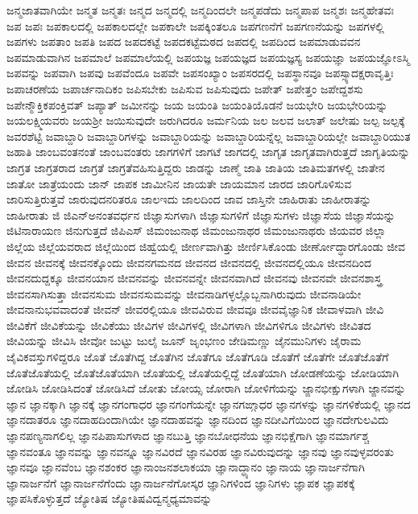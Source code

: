 {ಜನ್ಮಜಾತವಾಗಿಯೇ
ಜನ್ಮತ
ಜನ್ಮತಃ
ಜನ್ಮದ
ಜನ್ಮದಲ್ಲಿ
ಜನ್ಮದಿಂದಲೇ
ಜನ್ಮಪಡೆದು
ಜನ್ಮಪಾಪ
ಜನ್ಮಶಃ
ಜನ್ಮಹೇತವಃ
ಜಪ
ಜಪಃ
ಜಪಕಾಲದಲ್ಲಿ
ಜಪಕಾಲದಲ್ಲೇ
ಜಪಕಾಲೇ
ಜಪಕ್ಕಿಂತಲೂ
ಜಪಗಣನೆಗೆ
ಜಪಗಣನೆಯನ್ನು
ಜಪಗಳಲ್ಲಿ
ಜಪಗಳು
ಜಪತಾಂ
ಜಪತಿ
ಜಪದ
ಜಪದಕಟ್ಟೆ
ಜಪದಕಟ್ಟೆಮಠದ
ಜಪದಲ್ಲಿ
ಜಪದಿಂದ
ಜಪಮಾಡುವವನ
ಜಪಮಾಡುವಾಗಿನ
ಜಪಮಾಲೆ
ಜಪಮಾಲೆಯಲ್ಲಿ
ಜಪಯಜ್ಞ
ಜಪಯಜ್ಞದ
ಜಪಯಜ್ಞಸ್ಯ
ಜಪಯಜ್ಞಾ
ಜಪಯಜ್ಞೋಽಸ್ಮಿ
ಜಪವನ್ನು
ಜಪವಾಗಿ
ಜಪವು
ಜಪವೆಂದೂ
ಜಪವೇ
ಜಪಸಂಖ್ಯಾಂ
ಜಪಸರದಲ್ಲಿ
ಜಪಸ್ಥಾನವೂ
ಜಪಸ್ಸ್ಯಾದಕ್ಷರಾವೃತ್ತಿಃ
ಜಪಾಚರಣೆಯ
ಜಪಾರ್ಚನಾದಿಕಂ
ಜಪಿಸಬೇಕು
ಜಪಿಸುವ
ಜಪಿಸುವುದು
ಜಪೇತ್
ಜಪೇತ್ತಂ
ಜಪೇದ್ದಶಸು
ಜಪೇನ್ಮೌಕ್ತಿಕಪಂಕ್ತಿವತ್
ಜಪ್ಯಾತ್
ಜಮೀನನ್ನು
ಜಯ
ಜಯಂತಿ
ಜಯಂತಿಯೊಡನೆ
ಜಯಭೇರಿ
ಜಯಭೇರಿಯನ್ನು
ಜಯಲಕ್ಷ್ಮಿಯವರು
ಜಯಶ್ರೀ
ಜಯಿಸುವುದೇ
ಜರುಗಿದರೂ
ಜರ್ಮನಿಯ
ಜಲ
ಜಲವ
ಜಲಾತ್
ಜಲೇಷು
ಜಲ್ಪ
ಜಲ್ಪಕ್ಕೆ
ಜವರಶೆಟ್ಟಿ
ಜವಾಬ್ದಾರಿ
ಜವಾಬ್ದಾರಿಗಳನ್ನು
ಜವಾಬ್ದಾರಿಯನ್ನು
ಜವಾಬ್ದಾರಿಯನ್ನೆಲ್ಲ
ಜವಾಬ್ದಾರಿಯಲ್ಲೇ
ಜವಾಬ್ದಾರಿಯುತ
ಜಹಾತಿ
ಜಾಂಬವಂತನಂತೆ
ಜಾಂಬವಂತರು
ಜಾಗಗಳಿಗೆ
ಜಾಗಟೆ
ಜಾಗದಲ್ಲಿ
ಜಾಗೃತ
ಜಾಗೃತವಾಗಿರುತ್ತದೆ
ಜಾಗೃತಿಯನ್ನು
ಜಾಗ್ರತ
ಜಾಗ್ರತರಾದ
ಜಾಗ್ರತೆ
ಜಾಗ್ರತೆವಹಿಸುತ್ತಿದ್ದರು
ಜಾಡನ್ನು
ಜಾಣ್ಮೆ
ಜಾತಿ
ಜಾತಿಯ
ಜಾತಿಮತಗಳಲ್ಲಿ
ಜಾತೇನ
ಜಾತೋ
ಜಾತ್ರೆಯಂದು
ಜಾನ್
ಜಾಪಕ
ಜಾಮೀನಿನ
ಜಾಯತೇ
ಜಾಯಮಾನ
ಜಾರದ
ಜಾರಿಗೊಳಿಸುವ
ಜಾರಿಸುತ್ತಿರುತ್ತವೆ
ಜಾರುವುದನರಿತರೂ
ಜಾಲಇದು
ಜಾಲದಿಂದ
ಜಾವ
ಜಾಸ್ತಿನೇ
ಜಾಹಿರಾತು
ಜಾಹೀರಾತನ್ನು
ಜಾಹೀರಾತು
ಜಿ
ಜಿಎನ್ಅನಂತವರ್ಧನ
ಜಿಜ್ಞಾಸುಗಳಾಗಿ
ಜಿಜ್ಞಾಸುಗಳಿಗೆ
ಜಿಜ್ಞಾಸುಗಳು
ಜಿಜ್ಞಾಸೆಯ
ಜಿಜ್ಞಾಸೆಯನ್ನು
ಜಿಟಿನಾರಾಯಣ
ಜಿನುಗುತ್ತದೆ
ಜಿಪಿಎಸ್
ಜಿಮಂಜುನಾಥ
ಜಿಮಂಜುನಾಥರ
ಜಿಮಂಜುನಾಥರು
ಜಿಯವರ
ಜಿಲ್ಲಾ
ಜಿಲ್ಲೆಯ
ಜಿಲ್ಲೆಯವರಾದ
ಜಿಲ್ಲೆಯಿಂದ
ಜಿಹ್ವೆಯಲ್ಲಿ
ಜೀರ್ಣವಾಗಿತ್ತು
ಜೀರ್ಣಿಸಿಕೊಂಡು
ಜೀರ್ಣೋದ್ಧಾರಗೊಂಡು
ಜೀವ
ಜೀವನ
ಜೀವನಕ್ಕೆ
ಜೀವನಕ್ಕೊಂದು
ಜೀವನಗಮನದ
ಜೀವನದ
ಜೀವನದಲ್ಲಿ
ಜೀವನದಲ್ಲಿಯೂ
ಜೀವನದಿಂದ
ಜೀವನದುದ್ದಕ್ಕೂ
ಜೀವನಯಾನ
ಜೀವನವನ್ನು
ಜೀವನವನ್ನೇ
ಜೀವನವಾಗಿದೆ
ಜೀವನವು
ಜೀವನವೇ
ಜೀವನಶಾಸ್ತ್ರ
ಜೀವನಸಾಗಿಸುತ್ತಾ
ಜೀವನಸುಮ
ಜೀವನಸುಮವನ್ನು
ಜೀವನಾಡಿಗಳ್ಳಲ್ಲೊಬ್ಬನಾಗಿರುವುದು
ಜೀವನಾಡಿಯೇ
ಜೀವನಾನುಭವವಾದಂತೆ
ಜೀವನ್
ಜೀವರಲ್ಲಿಯೂ
ಜೀವವಿರುವ
ಜೀವವೂ
ಜೀವವೈಜ್ಞಾನಿಕ
ಜೀವಾಳವಾಗಿ
ಜೀವಿ
ಜೀವಿಕೆಗೆ
ಜೀವಿಕೆಯನ್ನು
ಜೀವಿಕೆಯು
ಜೀವಿಗಳ
ಜೀವಿಗಳಲ್ಲಿ
ಜೀವಿಗಳಾಗಿ
ಜೀವಿಗಳಿಗೂ
ಜೀವಿಗಳು
ಜೀವಿತದ
ಜೀವಿಯನ್ನು
ಜೀವಿಸಿ
ಜೀವೋ
ಜುಟ್ಟು
ಜುಲೈ
ಜೂನ್
ಜೃಂಭಣಂ
ಜೇಡಿಮಣ್ಣು
ಜೈನಮುನಿಗಳು
ಜೈರಾಮ
ಜೈವಿಕವಸ್ತುಗಳಿದ್ದರೂ
ಜೊತೆ
ಜೊತೆಗಿದ್ದ
ಜೊತೆಗಿನ
ಜೊತೆಗೂ
ಜೊತೆಗೂಡಿ
ಜೊತೆಗೆ
ಜೊತೆಗೇ
ಜೊತೆಜೊತೆಗೆ
ಜೊತೆಜೊತೆಯಲ್ಲಿ
ಜೊತೆಜೊತೆಯಾಗಿ
ಜೊತೆಯಲ್ಲಿ
ಜೊತೆಯಲ್ಲಿದ್ದೆ
ಜೊತೆಯಾಗಿ
ಜೋಡಣೆಯನ್ನು
ಜೋಡಿಯಾಗಿ
ಜೋಡಿಸಿ
ಜೋಡಿಸಿದಂತೆ
ಜೋಡಿಸಿದೆ
ಜೋತು
ಜೋಯ್ಸ
ಜೋರಾಗಿ
ಜೋಳಿಗೆಯನ್ನು
ಜ್ಙಾನಭೀಕ್ಷುಗಳಾಗಿ
ಜ್ಙಾನವನ್ನು
ಜ್ಞಾನ
ಜ್ಞಾನಕ್ಕಾಗಿ
ಜ್ಞಾನಕ್ಕೆ
ಜ್ಞಾನಗಂಗಾಧರ
ಜ್ಞಾನಗಂಗೆಯನ್ನೇ
ಜ್ಞಾನಗಙ್ಗಾಧರ
ಜ್ಞಾನಗಳನ್ನು
ಜ್ಞಾನಗಳಿಕೆಯಲ್ಲಿ
ಜ್ಞಾನದ
ಜ್ಞಾನದಾತರೂ
ಜ್ಞಾನದಾಹದಿಂದಾಗಿಯೇ
ಜ್ಞಾನದಾಹವನ್ನು
ಜ್ಞಾನದಿಂದ
ಜ್ಞಾನದೀವಿಗೆಯಿಂದ
ಜ್ಞಾನದೇಗುಲವಿದು
ಜ್ಞಾನಪಣ್ಯನಾಗಲಿಲ್ಲ
ಜ್ಞಾನಪಿಪಾಸುಗಳಾದ
ಜ್ಞಾನಬುತ್ತಿ
ಜ್ಞಾನಬೋಧನೆಯ
ಜ್ಞಾನಭಿಕ್ಷೆಗಾಗಿ
ಜ್ಞಾನಮಾರ್ಗಶ್ಚ
ಜ್ಞಾನವಂತೂ
ಜ್ಞಾನವನ್ನು
ಜ್ಞಾನವನ್ನೂ
ಜ್ಞಾನವಿರದೆ
ಜ್ಞಾನವಿರಹ
ಜ್ಞಾನವಿರುವುದನ್ನು
ಜ್ಞಾನವು
ಜ್ಞಾನವುಳ್ಳವರಂತು
ಜ್ಞಾನವೂ
ಜ್ಞಾನವೆಂಬ
ಜ್ಞಾನಶಂಕರ
ಜ್ಞಾನಾಂಜನಶಲಾಕಯಾ
ಜ್ಞಾನಾದ್ಧ್ಯಾನಂ
ಜ್ಞಾನಾಯ
ಜ್ಞಾನಾರ್ಜನೆಗಾಗಿ
ಜ್ಞಾನಾರ್ಜನೆಗೆ
ಜ್ಞಾನಾರ್ಜನೆಗೆಂದು
ಜ್ಞಾನಾರ್ಜನೆಗೋಸ್ಕರ
ಜ್ಞಾನಿಗಳಿಂದ
ಜ್ಞಾನಿಗಳು
ಜ್ಞಾಪಕ
ಜ್ಞಾಪಕಕ್ಕೆ
ಜ್ಞಾಪಸಿಕೊಳ್ಳುತ್ತದೆ
ಜ್ಯೋತಿಷ
ಜ್ಯೋತಿಷವಿದ್ವನ್ಮಧ್ಯಮಾವನ್ನು
}

